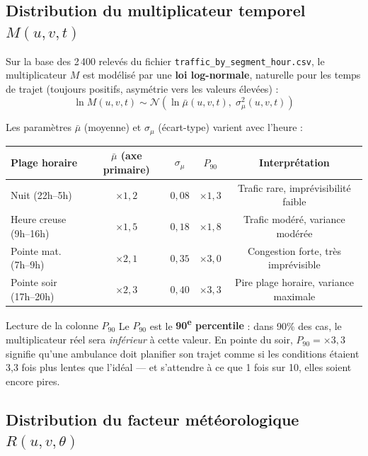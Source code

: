 \documentclass[12pt,a4paper]{article}
\theoremstyle{definition}
\theoremstyle{remark}
\begin{document}
\subsection{Distribution du multiplicateur temporel $M(u,v,t)$}

Sur la base des 2\,400 relevés du fichier
\texttt{traffic\_by\_segment\_hour.csv}, le multiplicateur $M$
est modélisé par une \textbf{loi log-normale}, naturelle pour
les temps de trajet (toujours positifs, asymétrie vers les
valeurs élevées) :
\[
  \ln M(u,v,t) \sim \mathcal{N}\!\left(\ln\bar{\mu}(u,v,t),\;
  \sigma_\mu^2(u,v,t)\right)
\]

Les paramètres $\bar{\mu}$ (moyenne) et $\sigma_\mu$ (écart-type)
varient avec l'heure :

\begin{center}
\begin{tabular}{lcccc}
  \toprule
  \textbf{Plage horaire} & \textbf{$\bar{\mu}$ (axe primaire)} &
  \textbf{$\sigma_\mu$} & \textbf{$P_{90}$} & \textbf{Interprétation} \\
  \midrule
  Nuit (22h–5h)         & $\times 1{,}2$ & $0{,}08$ & $\times 1{,}3$ &
    Trafic rare, imprévisibilité faible \\
  Heure creuse (9h–16h) & $\times 1{,}5$ & $0{,}18$ & $\times 1{,}8$ &
    Trafic modéré, variance modérée \\
  Pointe mat. (7h–9h)   & $\times 2{,}1$ & $0{,}35$ & $\times 3{,}0$ &
    Congestion forte, très imprévisible \\
  Pointe soir (17h–20h) & $\times 2{,}3$ & $0{,}40$ & $\times 3{,}3$ &
    Pire plage horaire, variance maximale \\
  \bottomrule
\end{tabular}
\end{center}

\begin{alertbox}{Lecture de la colonne $P_{90}$}
Le $P_{90}$ est le \textbf{90\textsuperscript{e} percentile} :
dans 90\% des cas, le multiplicateur réel sera \emph{inférieur} à
cette valeur. En pointe du soir, $P_{90} = \times 3{,}3$ signifie
qu'une ambulance doit planifier son trajet comme si les conditions
étaient 3,3 fois plus lentes que l'idéal — et s'attendre à ce que
1 fois sur 10, elles soient encore pires.
\end{alertbox}

\subsection{Distribution du facteur météorologique $R(u,v,\theta)$}
\end{document}
